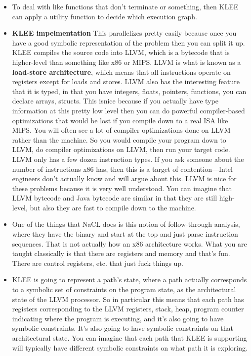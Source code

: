 \documentclass[12pt]{article}
\theoremstyle{definition}
\begin{document}
\begin{itemize}
    \item To deal with like functions that don't terminate or something, then KLEE can apply a utility function to decide which execution graph.

    \item \textbf{KLEE impelmentation} This parallelizes pretty easily because once you have a good symbolic representation of the problem then you can split it up. KLEE compiles the source code into LLVM, which is a bytecode that is higher-level than something like x86 or MIPS. LLVM is what is known as a \textbf{load-store architecture}, which means that all instructions operate on registers except for loads and stores. LLVM also has the interesting feature that it is typed, in that you have integers, floats, pointers, functions, you can declare arrays, structs. This isnice because if you actually have type information at this pretty low level then you can do powerful compiler-based optimizations that would be lost if you compile down to a real ISA like MIPS. You will often see a lot of compiler optimizations done on LLVM rather than the machine. So you would compile your program down to LLVM, do compiler optimizations on LLVM, then run your target code. LLVM only has a few dozen instruction types. If you ask someone about the number of instructions x86 has, then this is a target of contention---Intel engineers don't actually know and will argue about this. LLVM is nice for these problems because it is very well understood. You can imagine that LLVM bytecode and Java bytecode are similar in that they are still high-level, but also they are fast to compile down to the machine.
    
    \item One of the things that NaCL does is this notion of follow-through analysis, where they have the binary and start at the top and just parse instruction sequences. That is not actually how an x86 architecture works. What you are taught classically is that there are registers and memory and that's fun. There are control registers, etc. that just fuck things up.

    \item KLEE is going to represent a path's state, where a path actually corresponds to a symbolic set of constraints on the program state, as the architectural state of the LLVM processor. So in particular this means that each path has registers corresponding to the LLVM registers, stack, heap, program counter indicating where the program is executing, and it's also going to have symbolic constraints. It's also going to have symbolic constraints on that architectural state. You can imagine that each path that KLEE is supporting will typically have different symbolic constraints on what path it is exploring. 


\end{itemize}
\end{document}
